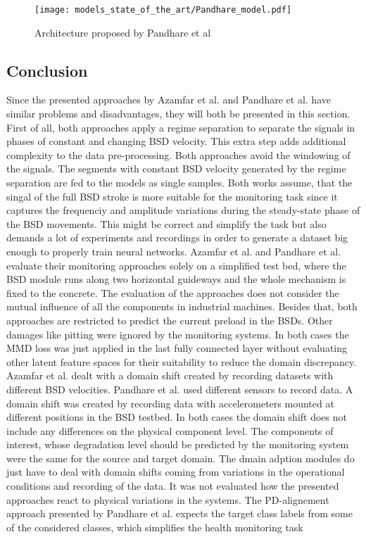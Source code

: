 \begin{figure}[H]
  \centering
  \texttt{[image: models\_state\_of\_the\_art/Pandhare\_model.pdf]}
  \caption{Architecture proposed by Pandhare et al \cite{Pandhare2021}}
  \label{fig:Pandhare_model}
\end{figure}

\subsection{Conclusion}
Since the presented approaches by Azamfar et al. \cite{AZAMFAR2020103932} and Pandhare et al. \cite{Pandhare2021} have similar problems and disadvantages, they will both be presented in this section. First of all, both approaches apply a regime separation to separate the signals in phases of constant and changing BSD velocity. This extra step adds additional complexity to the data pre-processing. Both approaches avoid the windowing of the signals. The segments with constant BSD velocity generated by the regime separation are fed to the models as single samples. Both works assume, that the singal of the full BSD stroke is more suitable for the monitoring task since it captures the frequenciy and amplitude variations during the steady-state phase of the BSD movements. This might be correct and simplify the task but also demands a lot of experiments and recordings in order to generate a dataset big enough to properly train neural networks. Azamfar et al. and  Pandhare et al. evaluate their monitoring approaches solely on a simplified test bed, where the BSD module runs along two horizontal guideways and the whole mechanism is fixed to the concrete. The evaluation of the approaches does not consider the mutual influence of all the components in industrial machines. Besides that, both approaches are restricted to predict the current preload in the BSDs. Other damages like pitting were ignored by the monitoring systems. In both cases the MMD loss was just applied in the last fully connected layer without evaluating other latent feature spaces for their suitability to reduce the domain discrepancy. Azamfar et al. dealt with a domain shift created by recording datasets with different BSD velocities. Pandhare et al. used different sensors to record data. A domain shift was created by recording data with accelerometers mounted at different positions in the BSD testbed. In both cases the domain shift does not include any differences on the physical component level. The components of interest, whose degradation level should be predicted by the monitoring system were the same for the source and target domain. The dmain adption modules do just have to deal with domain shifts coming from variations in the operational conditions and recording of the data. It was not evaluated how the presented approaches react to physical variations in the systems. The PD-alignement approach presented by Pandhare et al. expects the target class labels from some of the considered classes, which simplifies the health monitoring task


